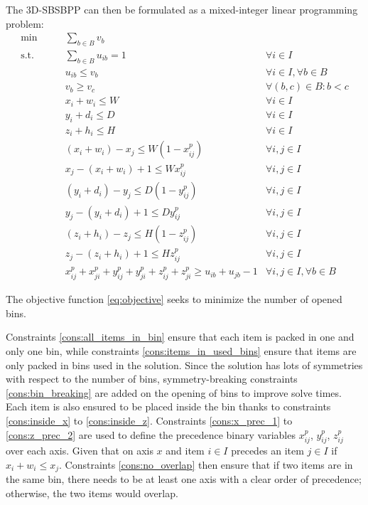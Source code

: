 The 3D-SBSBPP can then be formulated as a mixed-integer linear programming problem:
\label{par:standard_const}
\begin{align}
   \min       \qquad& \sum\limits_{b \in B} v_b & \label{eq:objective} \\
   \text{s.t.} \qquad& \sum\limits_{b \in B}{u_{ib}} = 1 & \forall i \in I  \label{cons:all_items_in_bin} \\
                    & u_{ib} \le v_b & \forall i \in I, \forall b \in B \label{cons:items_in_used_bins} \\
                    & v_b \ge v_c & \forall (b,c) \in B : b < c  \label{cons:bin_breaking} \\
                    & x_i + w_i \le W & \forall i \in I \label{cons:inside_x} \\ 
                    & y_i + d_i \le D & \forall i \in I \label{cons:inside_y} \\ 
                    & z_i + h_i \le H & \forall i \in I \label{cons:inside_z} \\ 
                    & (x_i + w_i) - x_j\le W(1 - x^p_{ij}) & \forall i,j \in I \label{cons:x_prec_1} \\
                    & x_j - (x_i + w_i) + 1 \le W x^p_{ij} & \forall i,j \in I \label{cons:x_prec_2} \\
                    & (y_i + d_i) - y_j \le D(1 - y^p_{ij}) & \forall i,j \in I \label{cons:y_prec_1} \\
                    & y_j - (y_i + d_i) + 1 \le D y^p_{ij} & \forall i,j \in I \label{cons:y_prec_2} \\
                    & (z_i + h_i) - z_j\le H(1 - z^p_{ij}) & \forall i,j \in I \label{cons:z_prec_1} \\
                    & z_j - (z_i + h_i) + 1 \le H z^p_{ij} & \forall i,j \in I \label{cons:z_prec_2} \\
                    & x^p_{ij} + x^p_{ji} + y^p_{ij} + y^p_{ji} + z^p_{ij} + z^p_{ji} \ge u_{ib} + u_{jb} - 1 & \forall i,j \in I, \forall b \in B \label{cons:no_overlap}
\end{align}

The objective function \ref{eq:objective} seeks to minimize the number of opened bins.

Constraints \ref{cons:all_items_in_bin} ensure that each item is packed in one and only one bin, while constraints \ref{cons:items_in_used_bins} ensure that items are only packed in bins used in the solution.
Since the solution has lots of symmetries with respect to the number of bins, symmetry-breaking constraints \ref{cons:bin_breaking} are added on the opening of bins to improve solve times.
Each item is also ensured to be placed inside the bin thanks to constraints \ref{cons:inside_x} to \ref{cons:inside_z}.
Constraints \ref{cons:x_prec_1} to \ref{cons:z_prec_2} are used to define the precedence binary variables $x^p_{ij}$, $y^p_{ij}$, $z^p_{ij}$ over each axis. Given that on axis $x$ and item $i \in I$ precedes an item $j \in I$ if $x_i + w_i \le x_j$.
Constraints \ref{cons:no_overlap} then ensure that if two items are in the same bin, there needs to be at least one axis with a clear order of precedence; otherwise, the two items would overlap.

